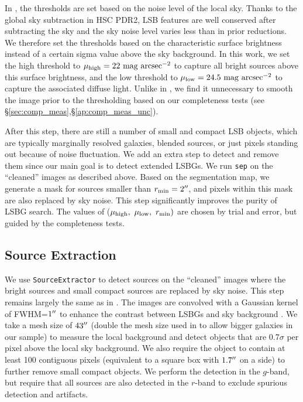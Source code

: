 \documentclass[twocolumn,astrosymb,twocolappendix]{aastex631}
\newcommand{\sbunit}{\mathrm{mag\ arcsec}^{-2}}
\newcommand{\code}[1]{\texttt{#1}}
\begin{document}
\begin{CJK*}{UTF8}{gbsn}
In , the thresholds are set based on the noise level of the local sky. Thanks to the global sky subtraction in HSC PDR2, LSB features are well conserved after subtracting the sky and the sky noise level varies less than in prior reductions. We therefore set the thresholds based on the characteristic surface brightness instead of a certain sigma value above the sky background. In this work, we set the high threshold to $\mu_{\rm high} = 22\ \sbunit$ to capture all bright sources above this surface brightness, and the low threshold to $\mu_{\rm low} = 24.5\ \sbunit$ to capture the associated diffuse light. Unlike in , we find it unnecessary to smooth the image prior to the thresholding based on our completeness tests (see \S \ref{sec:comp_meas},\S\ref{ap:comp_meas_unc}).   

After this step, there are still a number of small and compact LSB objects, which are typically marginally resolved galaxies, blended sources, or just pixels standing out because of noise fluctuation. We add an extra step to detect and remove them since our main goal is to detect extended LSBGs. We run \code{sep} on the ``cleaned'' images as described above. Based on the segmentation map, we generate a mask for sources smaller than $r_{\rm min} = 2\mbox{$^{\prime\prime}$}$, and pixels within this mask are also replaced by sky noise. This step significantly improves the purity of LSBG search. The values of ($\mu_{\rm high},\ \mu_{\rm low},\ r_{\rm min})$ are chosen by trial and error, but guided by the completeness tests. 
    
\subsection{Source Extraction}
We use \code{SourceExtractor} to detect sources on the ``cleaned'' images where the bright sources and small compact sources are replaced by sky noise. This step remains largely the same as in . The images are convolved with a Gaussian kernel of FWHM=$1\mbox{$^{\prime\prime}$}$ to enhance the contrast between LSBGs and sky background \citep[e.g.,][]{Irwin1985,Akhlaghi2015,Greco2018}. We take a mesh size of $43\mbox{$^{\prime\prime}$}$ (double the mesh size used in  to allow bigger galaxies in our sample) to measure the local background and detect objects that are 0.7$\sigma$ per pixel above the local sky background. We also require the object to contain at least 100 contiguous pixels (equivalent to a square box with $1.7\mbox{$^{\prime\prime}$}$ on a side) to further remove small compact objects. We perform the detection in the $g$-band, but require that all sources are also detected in the $r$-band to exclude spurious detection and artifacts.
    

\end{CJK*}
\end{document}
